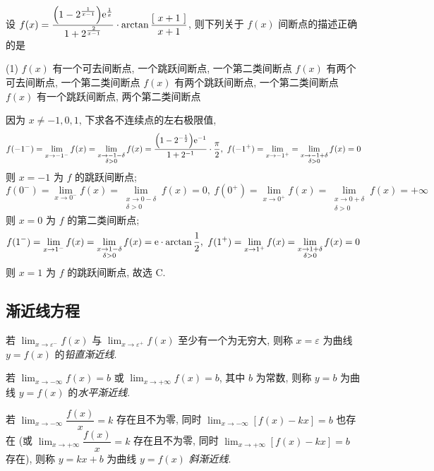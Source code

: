 \begin{example}
    设 $f(x)=\dfrac{\qty(1-2^{\frac{1}{x-1}})\mathrm{e}^{\frac{1}{x}}}{1+2^{\frac{2}{x-1}}}\cdot\arctan\dfrac{[~x+1~]}{x+1}$, 则下列关于 $f(x)$ 间断点的描述正确的是
    \begin{tasks}(1)
        \task $f(x)$ 有一个可去间断点, 一个跳跃间断点, 一个第二类间断点
        \task $f(x)$ 有两个可去间断点, 一个第二类间断点
        \task $f(x)$ 有两个跳跃间断点, 一个第二类间断点
        \task $f(x)$ 有一个跳跃间断点, 两个第二类间断点
    \end{tasks}
\end{example}
\begin{solution}
    因为 $x\neq-1,0,1$, 下求各不连续点的左右极限值,
    $$f(-1^-)=\lim_{x\to-1^-}f(x)=\lim_{\substack{x\to-1-\delta\\\delta>0}}f(x)=\dfrac{\qty(1-2^{-\frac{1}{2}})\mathrm{e}^{-1}}{1+2^{-1}}\cdot\dfrac{\pi}{2},~f(-1^+)=\lim_{x\to-1^+}=\lim_{\substack{x\to-1+\delta\\\delta>0}}f(x)=0$$
    则 $x=-1$ 为 $f$ 的跳跃间断点;
    $$f(0^-)=\lim_{x\to0^-}f(x)=\lim_{\substack{x\to0-\delta\\\delta>0}}f(x)=0,~f(0^+)=\lim_{x\to0^+}f(x)=\lim_{\substack{x\to0+\delta\\\delta>0}}f(x)=+\infty$$
    则 $x=0$ 为 $f$ 的第二类间断点;
    $$f(1^-)=\lim_{x\to1^-}f(x)=\lim_{\substack{x\to1-\delta\\\delta>0}}f(x)=\mathrm{e}\cdot\arctan\dfrac{1}{2},~f(1^+)=\lim_{x\to1^+}f(x)=\lim_{\substack{x\to1+\delta\\\delta>0}}f(x)=0$$
    则 $x=1$ 为 $f$ 的跳跃间断点, 故选 C.
\end{solution}

\subsection{渐近线方程}

\begin{definition}[铅直渐近线]
    若 $\displaystyle\lim_{x\to\varepsilon^-}f(x)$ 与 $\displaystyle \lim_{x\to\varepsilon^+}f(x)$ 至少有一个为无穷大, 则称 $x=\varepsilon$ 为曲线 $y=f(x)$ 的\textit{铅直渐近线}.
\end{definition}
\begin{definition}[水平渐近线]
    若 $\displaystyle\lim_{x\to-\infty}f(x)=b$ 或 $\displaystyle\lim_{x\to+\infty}f(x)=b$, 其中 $b$ 为常数, 则称 $y=b$ 为曲线 $y=f(x)$ 的\textit{水平渐近线}.
\end{definition}
\begin{definition}[斜渐近线]
    若 $\displaystyle\lim_{x\to-\infty}\dfrac{f(x)}{x}=k$ 存在且不为零, 同时 $\displaystyle\lim_{x\to-\infty}[f(x)-kx]=b$ 也存在 (或 $\displaystyle\lim_{x\to+\infty}\dfrac{f(x)}{x}=k$ 存在且不为零, 同时 $\displaystyle\lim_{x\to+\infty}[f(x)-kx]=b$ 存在),
    则称 $y=kx+b$ 为曲线 $y=f(x)$ \textit{斜渐近线}.
\end{definition}

